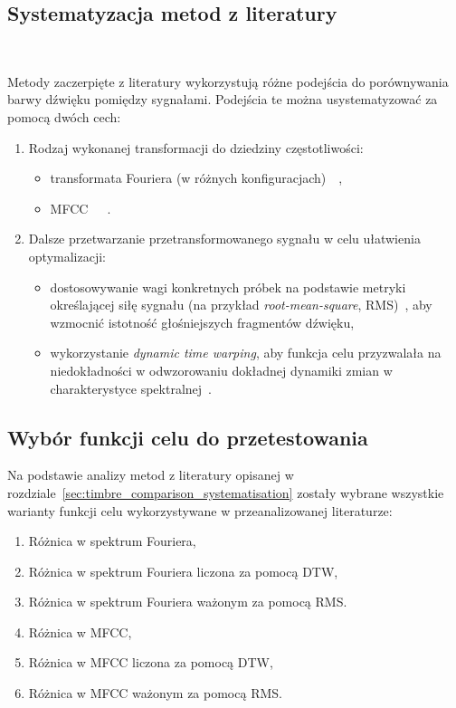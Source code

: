 \subsection{Systematyzacja metod z literatury}~\label{sec:timbre_comparison_systematisation}

Metody zaczerpięte z literatury wykorzystują różne podejścia do porównywania barwy dźwięku
pomiędzy sygnałami. Podejścia te można usystematyzować za pomocą dwóch cech:

\begin{enumerate}
  \item Rodzaj wykonanej transformacji do dziedziny częstotliwości:
  \begin{itemize}
    \item transformata Fouriera (w różnych konfiguracjach)~\cite{riffusion}~\cite{ddx7},
    \item MFCC~\cite{ieee_synth_programming}~\cite{evolutionary_puredata}~\cite{mfcc_dtw}.
  \end{itemize}
  \item Dalsze przetwarzanie przetransformowanego sygnału w celu ułatwienia optymalizacji:
    \begin{itemize}
      \item dostosowywanie wagi konkretnych próbek na podstawie metryki określającej siłę sygnału
        (na przykład \textit{root-mean-square}, RMS)~\cite{parallel_evolutionary_optimization_synth_parameters},
        aby wzmocnić istotność głośniejszych fragmentów dźwięku,
      \item wykorzystanie \textit{dynamic time warping}, aby funkcja celu przyzwalała na
        niedokładności w odwzorowaniu dokładnej dynamiki zmian w charakterystyce spektralnej~\cite{mfcc_dtw}.
    \end{itemize}
\end{enumerate}

\subsection{Wybór funkcji celu do przetestowania}

Na podstawie analizy metod z literatury opisanej w rozdziale~\ref{sec:timbre_comparison_systematisation} zostały wybrane wszystkie warianty
funkcji celu wykorzystywane w przeanalizowanej literaturze:

\begin{enumerate}
  \item Różnica w spektrum Fouriera,
  \item Różnica w spektrum Fouriera liczona za pomocą DTW,
  \item Różnica w spektrum Fouriera ważonym za pomocą RMS\@.
  \item Różnica w MFCC,
  \item Różnica w MFCC liczona za pomocą DTW\@,
  \item Różnica w MFCC ważonym za pomocą RMS\@.
\end{enumerate}

